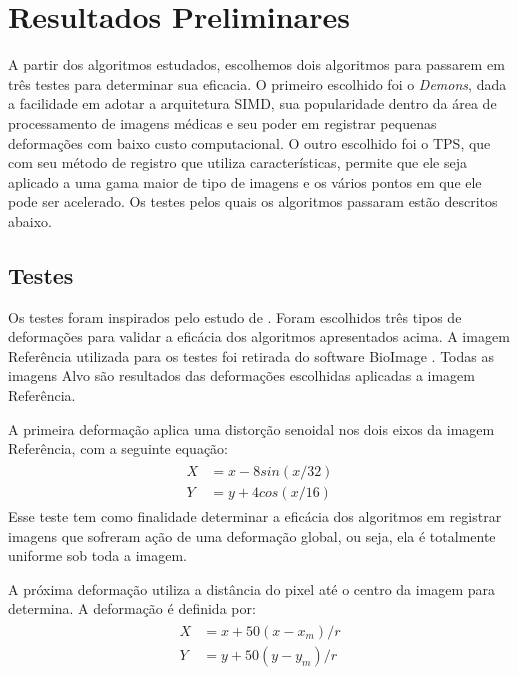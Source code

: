 \chapter{Resultados Preliminares}
\label{cap:resultados}
	A partir dos algoritmos estudados, escolhemos dois algoritmos para passarem em três testes para determinar sua 
eficacia. O primeiro escolhido foi o \textit{Demons}, dada a facilidade em adotar a arquitetura SIMD, sua popularidade 
dentro da área de processamento de imagens médicas e seu poder em registrar pequenas deformações com baixo custo 
computacional. O outro escolhido foi o TPS, que com seu método de registro que utiliza características, permite que ele
seja aplicado a uma gama maior de tipo de imagens e os vários pontos em que ele pode ser acelerado. Os testes pelos 
quais os algoritmos passaram estão descritos abaixo.

\section{Testes}
	Os testes foram inspirados pelo estudo de \cite{zagorchev2006comparative}. Foram escolhidos três tipos
de deformações para validar a eficácia dos algoritmos apresentados acima. A imagem Referência utilizada para os
testes foi retirada do software BioImage \cite{papademetris2005bioimage}. Todas as imagens Alvo são resultados
das deformações escolhidas aplicadas a imagem Referência.

	A primeira deformação aplica uma distorção senoidal nos dois eixos da imagem Referência, com a
seguinte equação:
\begin{align} \label{math:sin}
\begin{split}
	X &= x - 8sin(x/32) \\
	Y &= y + 4cos(x/16)
\end{split}  	
\end{align}
	Esse teste tem como finalidade determinar a eficácia dos algoritmos em registrar imagens que sofreram
ação de uma deformação global, ou seja, ela é totalmente uniforme sob toda a imagem.

	A próxima deformação utiliza a distância do pixel até o centro da imagem para determina. A deformação
é definida por:
\begin{align} \label{math:dist}
\begin{split}
	X &= x + 50(x-x_m)/r \\
	Y &= y + 50(y-y_m)/r 
\end{split} 
\end{align}

